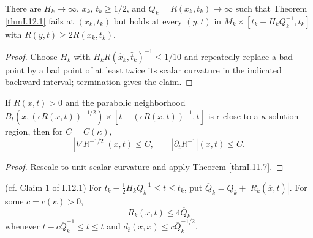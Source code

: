 \begin{lemma}
\label{lem:kl-canonical-neighborhood-theorem-canonical-neighborhoods-lemma}


\label{ptpicking}
There are $H_k\to\infty$, $x_k$, $t_k\geq1/2$, and
$Q_k=R(x_k,t_k)\to\infty$ such that Theorem \ref{thmI.12.1} fails at
$(x_k,t_k)$ but holds at every $(y,t)$ in
$M_k\times[t_k-H_kQ_k^{-1},t_k]$ with $R(y,t)\geq2R(x_k,t_k)$.
\end{lemma}
\begin{proof}
\sketch Choose $H_k$ with
$H_kR(\widehat x_k,\widehat t_k)^{-1}\leq1/10$ and repeatedly replace a bad
point by a bad point of at least twice its scalar curvature in the indicated
backward interval; termination gives the claim.
\end{proof}
\begin{lemma}
\label{lem:kl-canonical-neighborhood-theorem-existence-canonical-neighborhoods}

\label{grad}
If $R(x,t)>0$ and the parabolic neighborhood
$B_t(x,(\epsilon R(x,t))^{-1/2})\times
[t-(\epsilon R(x,t))^{-1},t]$ is $\epsilon$-close to a
$\kappa$-solution region, then for $C=C(\kappa)$,
\[
|\nabla R^{-1/2}|(x,t)\leq C,\qquad|\partial_tR^{-1}|(x,t)\leq C.
\]
\end{lemma}
\begin{proof}
\sketch Rescale to unit scalar curvature and apply Theorem \ref{thmI.11.7}.
\end{proof}
\begin{lemma}
\label{lem:kl-canonical-neighborhood-theorem-canonical-neighborhoods-lemma-8}

(cf. Claim 1 of I.12.1) \label{claim1}
For $t_k-\frac12H_kQ_k^{-1}\leq\overline t\leq t_k$, put
$\overline Q_k=Q_k+|R_k(\overline x,\overline t)|$.  For some
$c=c(\kappa)>0$,
\[
R_k(x,t)\leq4\overline Q_k
\]
whenever $\overline t-c\overline Q_k^{-1}\leq t\leq\overline t$ and
$d_{\overline t}(x,\overline x)\leq c\overline Q_k^{-1/2}$.
\end{lemma}
